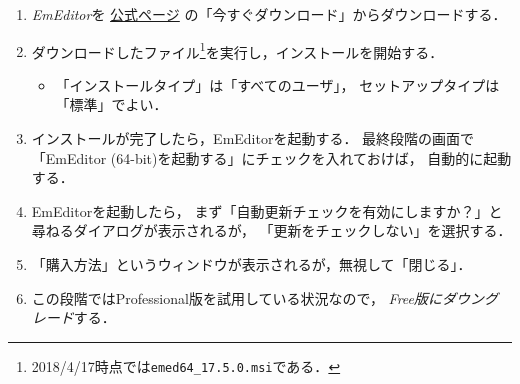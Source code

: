 \documentclass{ltjsarticle}
\begin{document}
\begin{enumerate}
\item \emph{EmEditor}を
  \href{http://jp.emeditor.com/}{公式ページ}%
  の「今すぐダウンロード」からダウンロードする．%
\item ダウンロードしたファイル\footnote{2018/4/17時点では\texttt{emed64\_17.5.0.msi}である．}を実行し，インストールを開始する．
  \begin{itemize}
  \item 「インストールタイプ」は「すべてのユーザ」， セットアップタイプは「標準」でよい．%
  \end{itemize}

\item インストールが完了したら，EmEditorを起動する．
  最終段階の画面で「EmEditor (64-bit)を起動する」にチェックを入れておけば，
  自動的に起動する．

\item %
  EmEditorを起動したら，%
  まず「自動更新チェックを有効にしますか？」と尋ねるダイアログが表示されるが，
  「更新をチェックしない」を選択する．

\item 「購入方法」というウィンドウが表示されるが，無視して「閉じる」．
\item この段階ではProfessional版を試用している状況なので，
  \emph{Free版にダウングレード}する．


\end{enumerate}
\end{document}
